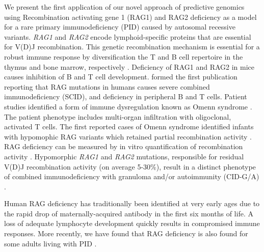 \documentclass[preprint,11pt,fleqn]{elsarticle}
\begin{document}
We present the first application of our novel approach of predictive genomics using Recombination activating gene 1 (RAG1) and RAG2 deficiency as a model for a rare primary immunodeficiency (PID) caused by autosomal recessive variants. 
\textit{RAG1} and \textit{RAG2} encode lymphoid-specific proteins that are essential for V(D)J recombination. 
This genetic recombination mechanism is essential for a robust immune response by diversification the T and B cell repertoire in the thymus and bone marrow, respectively \citep{schatz1989v,oettinger1990rag}. 
Deficiency of RAG1 
\citep{mombaerts1992rag} 
and RAG2 \citep{shinkai1992rag} 
in mice causes inhibition of B and T cell development.
\citet{schwarz1996rag} formed the first publication reporting that RAG mutations in humans causes severe combined immunodeficiency (SCID), and deficiency in peripheral B and T cells.
Patient studies identified a form of immune dysregulation known as Omenn syndrome
\citep{de1991restricted, rieux1998highly}. 
The patient phenotype includes multi-organ infiltration with oligoclonal, activated T cells.
The first reported cases of Omenn syndrome identified infants with hypomophic RAG variants which retained partial recombination activity
\citep{villa1998partial}.
RAG deficiency can be measured by in vitro quantification of recombination activity  
\citep{lawless2018prevalence, lee2014systematic, tirosh2018recombination}.
Hypomorphic \textit{RAG1} and \textit{RAG2} mutations, responsible for residual V(D)J recombination activity (on average 5-30\%), result in a distinct phenotype of combined immunodeficiency with granuloma and/or autoimmunity (CID-G/A) \citep{kwan2014newborn,walter2015broad,schuetz2008immunodeficiency}. 

Human RAG deficiency has traditionally been identified at very early ages due to the rapid drop of maternally-acquired antibody in the first six months of life. 
A loss of adequate lymphocyte development quickly results in compromised immune responses. 
More recently, we have found that RAG deficiency is also found for some adults living with PID
\citep{lawless2018prevalence}.
\end{document}
